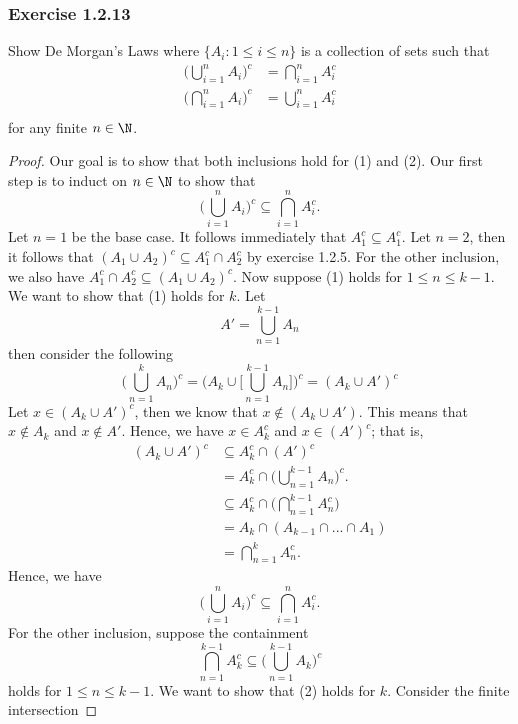 \subsubsection{Exercise 1.2.13}
Show De Morgan's Laws where \( \{ A_i : 1 \leq i \leq n \}  \) is a collection of sets such that
\begin{align*}
    \Big( \bigcup_{i = 1}^{n} A_i \Big)^c &= \bigcap_{ i=1 }^{ n } A_i^{c} \tag{1} \\
    \Big( \bigcap_{i = 1}^{n} A_i \Big)^c &= \bigcup_{ i=1 }^{ n } A_i^{c} \tag{2} \\
\end{align*}
for any finite \( n \in \N \). 
\begin{proof}
Our goal is to show that both inclusions hold for (1) and (2). Our first step is to induct on \( n\in \N \) to show that 
\[ \Big( \bigcup_{i=1}^{n} A_i \Big)^c \subseteq \bigcap_{i=1}^{n} A_i^c. \tag{1}\]
Let \( n = 1 \) be the base case. It follows immediately that \( A_1^c \subseteq A_1^c \). Let \( n = 2 \), then it follows that \( (A_1 \cup A_2)^c \subseteq A_1^c \cap A_2^c \) by exercise 1.2.5. For the other inclusion, we also have \( A_1^c \cap A_2^c \subseteq (A_1 \cup A_2)^c \). Now suppose (1) holds for \( 1 \leq n \leq k-1 \). We want to show that (1) holds for \( k \). Let 
\[ A' = \bigcup_{ n=1 }^{ k-1 } A_n  \]
then consider the following 
\[  \Big( \bigcup_{ n=1 }^{ k } A_n \Big)^c = \Big( A_k \cup \Big[ \bigcup_{ n=1 }^{ k-1 } A_n \Big] \Big)^c = ( A_k \cup A')^c \]
Let \( x \in (A_{k} \cup A')^c \), then we know that \( x \notin (A_k \cup A') \). This means that \( x \notin A_k  \) and \( x \notin A'\). Hence, we have \( x \in A_k^c \) and \( x \in (A')^c \); that is, 
\begin{align*}
    (A_k \cup A')^c &\subseteq A_k^c \cap (A')^c  \\
                    &= A_k^c \cap \Big( \bigcup_{n=1}^{k-1} A_n  \Big)^c. \\
                    &\subseteq A_k^c \cap \Big( \bigcap_{n=1}^{k-1} A_n^c \Big) \\
                    &= A_k \cap (A_{k-1} \cap ... \cap A_1) \\
                    &= \bigcap_{n=1}^{k} A_n^c.
\end{align*}
Hence, we have 
\[ \Big( \bigcup_{i=1}^{n} A_i \Big)^c \subseteq \bigcap_{i=1}^{n} A_i^c.\]
For the other inclusion, suppose the containment 
\[ \bigcap_{n=1}^{k-1}A_k^c \subseteq \Big( \bigcup_{n=1}^{k-1} A_k \Big)^c \tag{2} \]
holds for \( 1 \leq n \leq k -1  \). We want to show that (2) holds for \( k  \). Consider the finite intersection

\end{proof}
